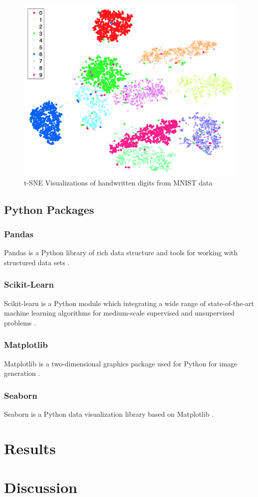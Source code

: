 \documentclass[11pt, a4paper]{article}
\begin{document}
            \begin{figure}[htbp]
                \centering
                \includegraphics[width=0.5 \linewidth]{figures/tsne.png}
                \caption{t-SNE Visualizations of handwritten digits from MNIST data \protect \cite{tsne1}}
                \label{fig:tsne}
            \end{figure}

        \subsection{Python Packages}
            \subsubsection{Pandas}
                Pandas is a Python library of rich data structure and tools for working with structured data sets \cite{pandas1}.

            \subsubsection{Scikit-Learn}
                Scikit-learn is a Python module which integrating a wide range of state-of-the-art machine learning algorithms for medium-scale supervised and unsupervised problems \cite{sklearn1}.

            \subsubsection{Matplotlib}
                Matplotlib is a two-dimensional graphics package used for Python for image generation \cite{matplotlib1}.

            \subsubsection{Seaborn}
                Seaborn is a Python data visualization library based on Matplotlib \cite{seaborn1}.


    \section{Results}

    \section{Discussion}

    
    
\end{document}
